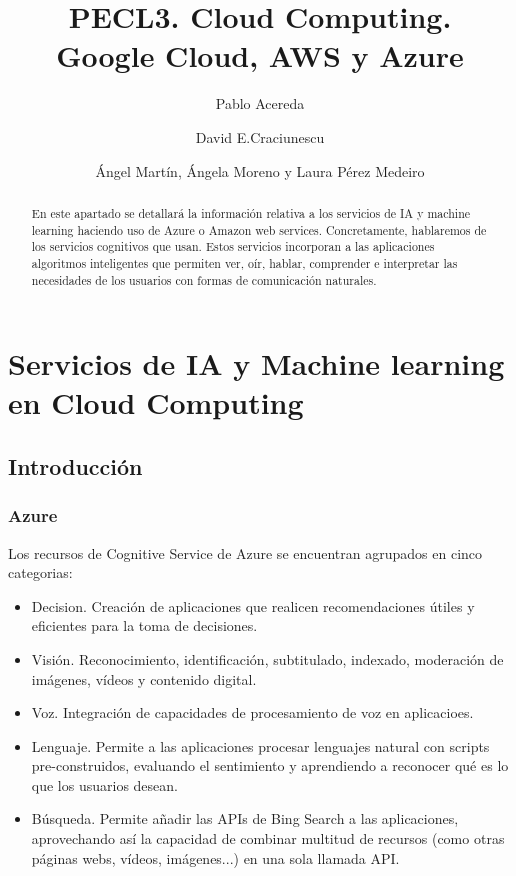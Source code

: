 \documentclass[runningheads]{llncs}
\begin{document}
	
	\title{PECL3. Cloud Computing.\\ Google Cloud, AWS y Azure}
	
	\author{Pablo Acereda \and  David E.Craciunescu \and Ángel Martín,  Ángela Moreno y Laura Pérez Medeiro}
	
	\maketitle              
	\section{Servicios de IA y Machine learning en Cloud Computing}
	\begin{abstract}
		En este apartado se detallará la información relativa a los servicios de IA y machine learning haciendo uso de Azure o Amazon web services. Concretamente, hablaremos de los servicios cognitivos que usan. Estos servicios incorporan a las aplicaciones algoritmos inteligentes que permiten ver, oír, hablar, comprender e interpretar las necesidades de los usuarios con formas de comunicación naturales.
	\end{abstract}
	
	\subsection{Introducción}
	\subsubsection{Azure}
	Los recursos de Cognitive Service de Azure se encuentran agrupados en cinco categorias: 
	\begin{itemize}
		\item Decision. Creación de aplicaciones que realicen recomendaciones útiles y eficientes para la toma de decisiones.
		\item Visión. Reconocimiento, identificación, subtitulado, indexado, moderación de imágenes, vídeos y contenido digital.
		\item Voz. Integración de capacidades de procesamiento de voz en aplicacioes.
		\item Lenguaje. Permite a las aplicaciones procesar lenguajes natural con scripts pre-construidos, evaluando el sentimiento y aprendiendo a reconocer qué es lo que los usuarios desean.
		\item Búsqueda. Permite añadir las APIs de Bing Search a las aplicaciones, aprovechando así la capacidad de combinar multitud de recursos (como otras páginas webs, vídeos, imágenes...) en una sola llamada API.
	\end{itemize}
\end{document}
